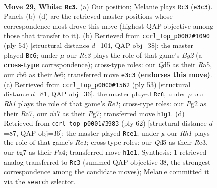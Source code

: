 \documentclass[11pt]{article}
\begin{document}
\clearpage

\begin{figure}[p]\centering
\begin{subfigure}{0.46\textwidth}\centering
\resizebox{\linewidth}{!}{%
\newchessgame
\chessboard[
  setfen={1k5r/1p2p1bn/1r1p4/1b1Q2p1/3PP3/1P2RP2/6PP/1K5R w - - 2 29},
  showmover=false,
  pgfstyle=straightmove, color=movearrow, markmove={e3-c3}
]}
\caption{}
\end{subfigure}\hfill
\begin{subfigure}{0.46\textwidth}\centering
\resizebox{\linewidth}{!}{%
\newchessgame
\chessboard[
  setfen={1r2r2k/4qppp/4b3/Rp6/5Q2/6P1/P4PBP/R5K1 w - - 0 28},
  showmover=false,
  pgfstyle=straightmove, color=movearrow, markmove={g2-c6}
]}
\caption{}
\end{subfigure}
\\[4pt]
\begin{subfigure}{0.46\textwidth}\centering
\resizebox{\linewidth}{!}{%
\newchessgame
\chessboard[
  setfen={4r1k1/r4pp1/p1p1p2p/P1PqP3/8/6P1/4QPP1/1RR3K1 b - - 0 27},
  showmover=false,
  pgfstyle=straightmove, color=movearrow, markmove={e8-c8}
]}
\caption{}
\end{subfigure}\hfill
\begin{subfigure}{0.46\textwidth}\centering
\resizebox{\linewidth}{!}{%
\newchessgame
\chessboard[
  setfen={r3r1k1/6bp/4p1p1/p1Pbn1P1/P7/1P2R2P/3Q2P1/2R3K1 w - - 3 32},
  showmover=false,
  pgfstyle=straightmove, color=movearrow, markmove={c1-e1}
]}
\caption{}
\end{subfigure}
\caption{\textbf{Move 29, White: \texttt{Rc3}.} (a) Our position; Melanie plays \texttt{Rc3} (\texttt{e3c3}). Panels (b)--(d) are the retrieved master positions whose correspondence most drove this move (highest QAP objective among those that transfer to it). (b) Retrieved from \texttt{ccrl\_top\_p0002\#1090} (ply 54) [structural distance $d$=104, QAP obj=38]: the master played \texttt{Bc6}; under $\mu$ our \emph{Re3} plays the role of that game's \emph{Bg2} (a \textbf{cross-type} correspondence); cross-type roles: our \emph{Q}d5 as their \emph{R}a5, our \emph{r}b6 as their \emph{b}e6; transferred move \texttt{e3c3} \textbf{(endorses this move)}. (c) Retrieved from \texttt{ccrl\_top\_p0000\#1562} (ply 53) [structural distance $d$=81, QAP obj=36]: the master played \texttt{Rc8}; under $\mu$ our \emph{Rh1} plays the role of that game's \emph{Re1}; cross-type roles: our \emph{P}g2 as their \emph{R}a7, our \emph{n}h7 as their \emph{P}g7; transferred move \texttt{h1g1}. (d) Retrieved from \texttt{ccrl\_top\_p0001\#3983} (ply 62) [structural distance $d$=87, QAP obj=36]: the master played \texttt{Rce1}; under $\mu$ our \emph{Rh1} plays the role of that game's \emph{Rc1}; cross-type roles: our \emph{Q}d5 as their \emph{R}e3, our \emph{b}g7 as their \emph{P}a4; transferred move \texttt{h1e1}. Synthesis: 1 retrieved analog transferred to \texttt{Rc3} (summed QAP objective 38, the strongest correspondence among the candidate moves); Melanie committed it via the \texttt{search} selector.}
\label{fig:thought-m56}
\end{figure}
\end{document}
